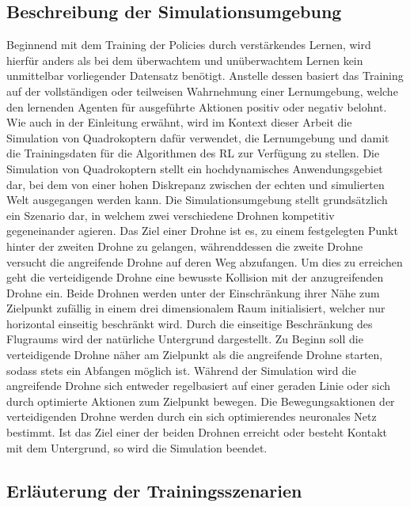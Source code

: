 \subsection{Beschreibung der Simulationsumgebung}

Beginnend mit dem Training der Policies durch verstärkendes Lernen, wird hierfür anders als bei dem überwachtem und unüberwachtem Lernen kein unmittelbar vorliegender Datensatz benötigt.
Anstelle dessen basiert das Training auf der vollständigen oder teilweisen Wahrnehmung einer Lernumgebung, welche den lernenden Agenten für ausgeführte Aktionen positiv oder negativ belohnt.
Wie auch in der Einleitung erwähnt, wird im Kontext dieser Arbeit die Simulation von Quadrokoptern dafür verwendet, die Lernumgebung und damit die Trainingsdaten für die Algorithmen des RL zur Verfügung zu stellen.
Die Simulation von Quadrokoptern stellt ein hochdynamisches Anwendungsgebiet dar, bei dem von einer hohen Diskrepanz zwischen der echten und simulierten Welt ausgegangen werden kann. 
Die Simulationsumgebung stellt grundsätzlich ein Szenario dar, in welchem zwei verschiedene Drohnen kompetitiv gegeneinander agieren.
Das Ziel einer Drohne ist es, zu einem festgelegten Punkt hinter der zweiten Drohne zu gelangen, währenddessen die zweite Drohne versucht die angreifende Drohne auf deren Weg abzufangen. 
Um dies zu erreichen geht die verteidigende Drohne eine bewusste Kollision mit der anzugreifenden Drohne ein.
Beide Drohnen werden unter der Einschränkung ihrer Nähe zum Zielpunkt zufällig in einem drei dimensionalem Raum initialisiert, welcher nur horizontal einseitig beschränkt wird.
Durch die einseitige Beschränkung des Flugraums wird der natürliche Untergrund dargestellt.
Zu Beginn soll die verteidigende Drohne näher am Zielpunkt als die angreifende Drohne starten, sodass stets ein Abfangen möglich ist.
Während der Simulation wird die angreifende Drohne sich entweder regelbasiert auf einer geraden Linie oder sich durch optimierte Aktionen zum Zielpunkt bewegen.
Die Bewegungsaktionen der verteidigenden Drohne werden durch ein sich optimierendes neuronales Netz bestimmt.
Ist das Ziel einer der beiden Drohnen erreicht oder besteht Kontakt mit dem Untergrund, so wird die Simulation beendet.

\subsection{Erläuterung der Trainingsszenarien}

